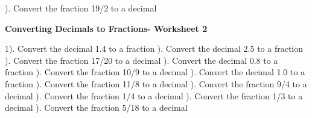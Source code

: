 \documentclass{article}%
\begin{document}
). Convert the fraction 19/2 to a decimal%
\newline%
\newline%
\newline%
\pagebreak%
\large%
\begin{center}%
\textbf{Converting Decimals to Fractions- Worksheet 2}%
\newline%
\newline%
\newline%
\end{center} \normalsize%
1). Convert the decimal 1.4 to a fraction%
\newline%
\newline%
). Convert the decimal 2.5 to a fraction%
\newline%
\newline%
). Convert the fraction 17/20 to a decimal%
\newline%
\newline%
). Convert the decimal 0.8 to a fraction%
\newline%
\newline%
). Convert the fraction 10/9 to a decimal%
\newline%
\newline%
). Convert the decimal 1.0 to a fraction%
\newline%
\newline%
). Convert the fraction 11/8 to a decimal%
\newline%
\newline%
). Convert the fraction 9/4 to a decimal%
\newline%
\newline%
). Convert the fraction 1/4 to a decimal%
\newline%
\newline%
). Convert the fraction 1/3 to a decimal%
\newline%
\newline%
). Convert the fraction 5/18 to a decimal%
\newline%
\end{document}
